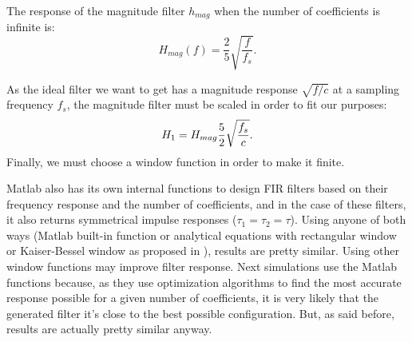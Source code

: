 The response of the magnitude filter $h_{mag}$ when the number of coefficients is infinite is:
\begin{equation}
H_{mag}(f) = \frac{2}{5}\sqrt{\frac{f}{f_s}}.
\end{equation}

As the ideal filter we want to get has a magnitude response $\sqrt{f/c}$ at a sampling frequency $f_s$, the magnitude filter must be scaled in order to fit our purposes:
\begin{equation}
\freqFilter[frequency][magnitude] = H_{mag}\frac{5}{2}\sqrt{\frac{f_s}{c}}. %
\end{equation}
Finally, we must choose a window function in order to make it finite.

Matlab also has its own internal functions to design FIR filters based on their frequency response and the number of coefficients, and in the case of these filters, it also returns symmetrical impulse responses ($\tau_1 = \tau_2 = \tau$). Using anyone of both ways (Matlab built-in function or analytical equations with rectangular window or Kaiser-Bessel window as proposed in \cite{FrankSchutz2015}), results are pretty similar. Using other window functions may improve filter response. Next simulations use the Matlab functions because, as they use optimization algorithms to find the most accurate response possible for a given number of coefficients, it is very likely that the generated filter it's close to the best possible configuration. But, as said before, results are actually pretty similar anyway.

